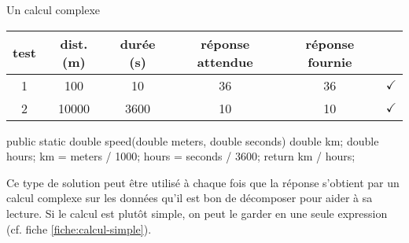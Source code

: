 \begin{Fiche}{Un calcul complexe}
	\begin{center}
		\begin{tabular}{|c|cccc|c|}
		\hline
			\rowcolor{black!40}
		test \no & dist. (m) & durée (s) & réponse attendue 
			& réponse fournie & {} \\
		\hline 
		1 & 100   & 10   & 36 & 36 & {\color{ForestGreen}$\checkmark$} \\\hline
		2 & 10000 & 3600 & 10 & 10 & {\color{ForestGreen}$\checkmark$} \\\hline
		\end{tabular}
	\end{center}								


\begin{java}
public static double speed(double meters, double seconds){
	double km;
	double hours;
	km = meters / 1000;
	hours = seconds / 3600;
	return km / hours;
}
\end{java}


	Ce type de solution peut être utilisé à chaque fois que la réponse s’obtient
	par un calcul complexe sur les données qu’il est bon de décomposer pour
	aider à sa lecture.  Si le calcul est plutôt simple, on peut le garder en
	une seule expression (cf. fiche \vref{fiche:calcul-simple}).
	
\end{Fiche}
